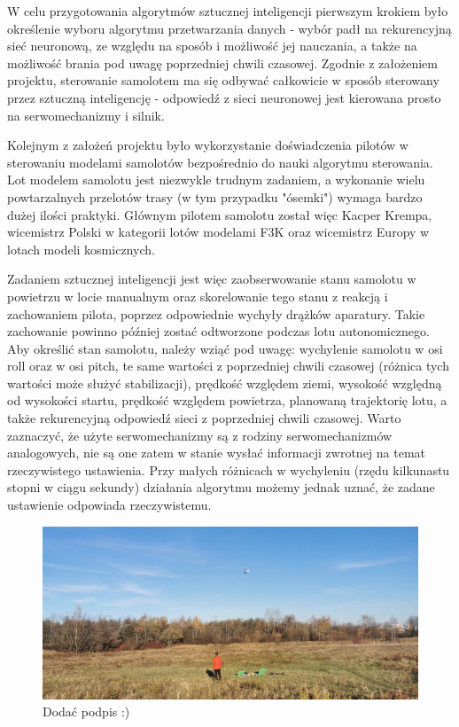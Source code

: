\documentclass[12pt, a4paper]{article}
\begin{document}
W celu przygotowania algorytmów sztucznej inteligencji pierwszym krokiem było określenie wyboru algorytmu przetwarzania danych - wybór padł na rekurencyjną sieć neuronową, ze względu na sposób i możliwość jej nauczania, a także na możliwość brania pod uwagę poprzedniej chwili czasowej. Zgodnie z założeniem projektu, sterowanie samolotem ma się odbywać całkowicie w sposób sterowany przez sztuczną inteligencję - odpowiedź z sieci neuronowej jest kierowana prosto na serwomechanizmy i silnik. 

Kolejnym z założeń projektu było wykorzystanie doświadczenia pilotów w sterowaniu modelami samolotów bezpośrednio do nauki algorytmu sterowania. Lot modelem samolotu jest niezwykle trudnym zadaniem, a wykonanie wielu powtarzalnych przelotów trasy (w tym przypadku "ósemki") wymaga bardzo dużej ilości praktyki. Głównym pilotem samolotu został więc Kacper Krempa, wicemistrz Polski w kategorii lotów modelami F3K oraz wicemistrz Europy w lotach modeli kosmicznych.

Zadaniem sztucznej inteligencji jest więc zaobserwowanie stanu samolotu w powietrzu w locie manualnym oraz skorelowanie tego stanu z reakcją i zachowaniem pilota, poprzez odpowiednie wychyły drążków aparatury. Takie zachowanie powinno później zostać odtworzone podczas lotu autonomicznego. Aby określić stan samolotu, należy wziąć pod uwagę: wychylenie samolotu w osi roll oraz w osi pitch, te same wartości z poprzedniej chwili czasowej (różnica tych wartości może służyć stabilizacji), prędkość względem ziemi, wysokość względną od wysokości startu, prędkość względem powietrza, planowaną trajektorię lotu, a także rekurencyjną odpowiedź sieci z poprzedniej chwili czasowej. Warto zaznaczyć, że użyte serwomechanizmy są z rodziny serwomechanizmów analogowych, nie są one zatem w stanie wysłać informacji zwrotnej na temat rzeczywistego ustawienia. Przy małych różnicach w wychyleniu (rzędu kilkunastu stopni w ciągu sekundy) działania algorytmu możemy jednak uznać, że zadane ustawienie odpowiada rzeczywistemu.

 \begin{figure}[ht]
    \centering
    \includegraphics[width=1\textwidth]{kacperlata}
    \caption{Dodać podpis :)}
\end{figure}
\end{document}
